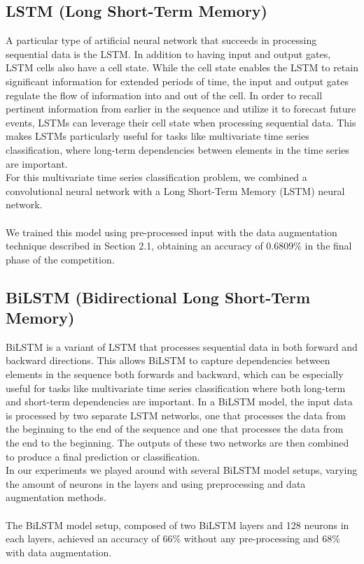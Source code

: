 \documentclass[11pt, oneside]{article}
\begin{document}
\subsection{LSTM (Long Short-Term Memory)}
A particular type of artificial neural network that succeeds in processing sequential data is the LSTM. In addition to having input and output gates, LSTM cells also have a cell state. While the cell state enables the LSTM to retain significant information for extended periods of time, the input and output gates regulate the flow of information into and out of the cell. In order to recall pertinent information from earlier in the sequence and utilize it to forecast future events, LSTMs can leverage their cell state when processing sequential data. This makes LSTMs particularly useful for tasks like multivariate time series classification, where long-term dependencies between elements in the time series are important.\\
For this multivariate time series classification problem, we combined a convolutional neural network with a Long Short-Term Memory (LSTM) neural network.\\\\
We trained this model using pre-processed input with the data augmentation technique described in Section 2.1, obtaining an accuracy of 0.6809\% in the final phase of the competition.
\subsection{BiLSTM (Bidirectional Long Short-Term Memory)}
BiLSTM is a variant of LSTM that processes sequential data in both forward and backward directions. This allows BiLSTM to capture dependencies between elements in the sequence both forwards and backward, which can be especially useful for tasks like multivariate time series classification where both long-term and short-term dependencies are important. In a BiLSTM model, the input data is processed by two separate LSTM networks, one that processes the data from the beginning to the end of the sequence and one that processes the data from the end to the beginning. The outputs of these two networks are then combined to produce a final prediction or classification.\\
In our experiments we played around with several BiLSTM model setups, varying the amount of neurons in the layers and using preprocessing and data augmentation methods.\\\\
The BiLSTM model setup, composed of two BiLSTM layers and 128 neurons in each layers, achieved an accuracy of 66\% without any pre-processing and 68\% with data augmentation.
\end{document}
